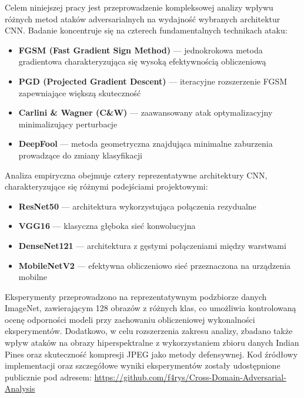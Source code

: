 \documentclass[12pt]{article}
\begin{document}
Celem niniejszej pracy jest przeprowadzenie kompleksowej analizy wpływu różnych metod ataków adversarialnych na wydajność wybranych architektur CNN. Badanie koncentruje się na czterech fundamentalnych technikach ataku:

\begin{itemize}
    \item \textbf{FGSM (Fast Gradient Sign Method)} \cite{goodfellow2014explaining} --- jednokrokowa metoda gradientowa charakteryzująca się wysoką efektywnością obliczeniową
    \item \textbf{PGD (Projected Gradient Descent)} \cite{madry2017towards} --- iteracyjne rozszerzenie FGSM zapewniające większą skuteczność
    \item \textbf{Carlini \& Wagner (C\&W)} \cite{carlini2017towards} --- zaawansowany atak optymalizacyjny minimalizujący perturbacje
    \item \textbf{DeepFool} \cite{moosavi2016deepfool} --- metoda geometryczna znajdująca minimalne zaburzenia prowadzące do zmiany klasyfikacji
\end{itemize}

Analiza empiryczna obejmuje cztery reprezentatywne architektury CNN, charakteryzujące się różnymi podejściami projektowymi:

\begin{itemize}
    \item \textbf{ResNet50} --- architektura wykorzystująca połączenia rezydualne
    \item \textbf{VGG16} --- klasyczna głęboka sieć konwolucyjna
    \item \textbf{DenseNet121} --- architektura z gęstymi połączeniami między warstwami
    \item \textbf{MobileNetV2} --- efektywna obliczeniowo sieć przeznaczona na urządzenia mobilne
\end{itemize}

Eksperymenty przeprowadzono na reprezentatywnym podzbiorze danych ImageNet, zawierającym 128 obrazów z różnych klas, co umożliwia kontrolowaną ocenę odporności modeli przy zachowaniu obliczeniowej wykonalności eksperymentów. Dodatkowo, w celu rozszerzenia zakresu analizy, zbadano także wpływ ataków na obrazy hiperspektralne z wykorzystaniem zbioru danych Indian Pines oraz skuteczność kompresji JPEG jako metody defensywnej. Kod źródłowy implementacji oraz szczegółowe wyniki eksperymentów zostały udostępnione publicznie pod adresem: \url{https://github.com/f4rys/Cross-Domain-Adversarial-Analysis}
\end{document}
